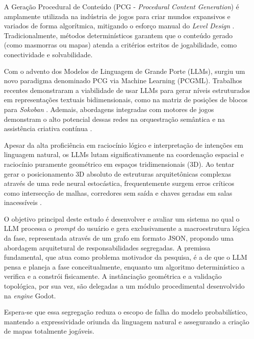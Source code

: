 \documentclass[
  12pt,
  a4paper,
  oneside,
  article,
  brazil
]{abntex2}
\begin{document}
A Geração Procedural de Conteúdo (PCG - \textit{Procedural Content Generation}) é amplamente utilizada na indústria de jogos para criar mundos expansivos e variados de forma algorítmica, mitigando o esforço manual do \textit{Level Design} \cite{summerville2018procedural}. Tradicionalmente, métodos determinísticos garantem que o conteúdo gerado (como masmorras ou mapas) atenda a critérios estritos de jogabilidade, como conectividade e solvabilidade. 

Com o advento dos Modelos de Linguagem de Grande Porte (LLMs), surgiu um novo paradigma denominado PCG via Machine Learning (PCGML). Trabalhos recentes demonstraram a viabilidade de usar LLMs para gerar níveis estruturados em representações textuais bidimensionais, como na matriz de posições de blocos para \textit{Sokoban} \cite{todd2023level}. Ademais, abordagens integradas com motores de jogos demonstram o alto potencial dessas redes na orquestração semântica e na assistência criativa contínua \cite{zhu2023calypso, tang2025unrealllm}.

Apesar da alta proficiência em raciocínio lógico e interpretação de intenções em linguagem natural, os LLMs lutam significativamente na coordenação espacial e raciocínio puramente geométrico em espaços tridimensionais (3D). Ao tentar gerar o posicionamento 3D absoluto de estruturas arquitetônicas complexas através de uma rede neural estocástica, frequentemente surgem erros críticos como intersecção de malhas, corredores sem saída e chaves geradas em salas inacessíveis \cite{xu2025constraint, sun2024roomplanner}.


O objetivo principal deste estudo é desenvolver e avaliar um sistema no qual o LLM processa o \textit{prompt} do usuário e gera exclusivamente a macroestrutura lógica da fase, representada através de um grafo em formato JSON, propondo uma abordagem arquitetural de responsabilidades segregadas. A premissa fundamental, que atua como problema motivador da pesquisa, é a de que o LLM pensa e planeja a fase conceitualmente, enquanto um algoritmo determinístico a verifica e a constrói fisicamente. A instânciação geométrica e a validação topológica, por sua vez, são delegadas a um módulo procedimental desenvolvido na \textit{engine} Godot. 

Espera-se que essa segregação reduza o escopo de falha do modelo probabilístico, mantendo a expressividade oriunda da linguagem natural e assegurando a criação de mapas totalmente jogáveis.

\end{document}
